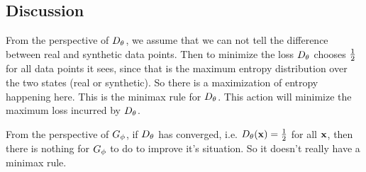 \subsection{Discussion}

From the perspective of $D_\theta$, we assume that we can not tell the
difference between real and synthetic data points. Then to minimize
the loss $D_\theta$ chooses ${1 \over 2}$ for all data points it sees, since
that is the maximum entropy distribution over the two states (real or
synthetic). So there is a maximization of entropy happening here. This
is the minimax rule for $D_\theta$. This action will minimize the maximum
loss incurred by $D_\theta$.

From the perspective of $G_\phi$, if $D_\theta$ has converged, i.e. $D_\theta(\mathbf{x}) =
{1 \over 2}$ for all $\mathbf{x}$, then there is nothing for $G_\phi$ to do to
improve it's situation. So it doesn't really have a minimax rule.

